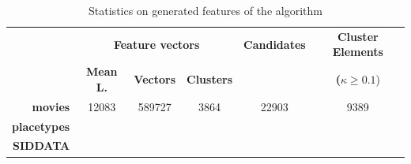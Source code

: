 \begingroup
\renewcommand*{\arraystretch}{2}
\begin{table}[]
	\centering
	\begin{tabular}{rccccc}
										  & \multicolumn{3}{c}{\textbf{Feature vectors}}           & \textbf{Candidates} & \textbf{Cluster Elements}   \\
										  & \textbf{Mean L.} & \textbf{Vectors} & \textbf{Clusters} &                     & \textbf{($\kappa\geq0.1$}) \\
    \midrule	
										  
	\textbf{movies \cite{Derrac2015}}     & 12083            & 589727           & 3864              & 22903               & 9389              		   \\
	\textbf{placetypes \cite{Derrac2015}} &                  &                  &                   &                     &                   		   \\
	\textbf{SIDDATA}                      &                  &                  &                   &                     &                  
	\end{tabular}
	\caption{Statistics on generated features of the algorithm}
	\label{tab:generated_stuff}
\end{table}
\endgroup

\begin{table}
\end{table}


